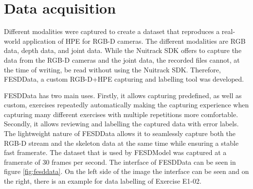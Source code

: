 \section{Data acquisition}
\label{sec:data_acquisition}

Different modalities were captured to create a dataset that reproduces a real-world application of HPE for RGB-D cameras. The different modalities are RGB data, depth data, and joint data. While the Nuitrack SDK offers to capture the data from the RGB-D cameras and the joint data, the recorded files cannot, at the time of writing, be read without using the Nuitrack SDK. Therefore, FESDData, a custom RGB-D+HPE capturing and labelling tool was developed. 

FESDData has two main uses. Firstly, it allows capturing predefined, as well as custom, exercises repeatedly automatically making the capturing experience when capturing many different exercises with multiple repetitions more comfortable. Secondly, it allows reviewing and labelling the captured data with error labels. The lightweight nature of FESDData allows it to seamlessly capture both the RGB-D stream and the skeleton data at the same time while ensuring a stable fast framerate. The dataset that is used by FESDModel was captured at a framerate of 30 frames per second. The interface of FESDData can be seen in figure \ref{fig:fesddata}. On the left side of the image the interface can be seen and on the right, there is an example for data labelling of Exercise E1-02.


